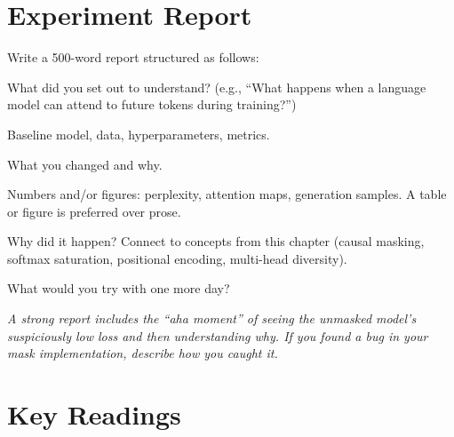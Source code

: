\section*{Experiment Report}

Write a 500-word report structured as follows:

\begin{description}[style=nextline, leftmargin=1.5em]
    \item[Question.] What did you set out to understand? (e.g., ``What happens when a language model can attend to future tokens during training?'')
    \item[Setup.] Baseline model, data, hyperparameters, metrics.
    \item[Interventions.] What you changed and why.
    \item[Results.] Numbers and/or figures: perplexity, attention maps, generation samples. A table or figure is preferred over prose.
    \item[Diagnosis.] Why did it happen? Connect to concepts from this chapter (causal masking, softmax saturation, positional encoding, multi-head diversity).
    \item[Next step.] What would you try with one more day?
\end{description}

\noindent\textit{A strong report includes the ``aha moment'' of seeing the unmasked model's suspiciously low loss and then understanding why. If you found a bug in your mask implementation, describe how you caught it.}


\section*{Key Readings}

\nocite{vaswani2017attention,radford2018improving,devlin2019bert,ba2016layer}

